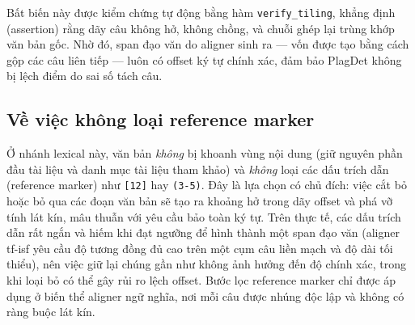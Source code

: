 Bất biến này được kiểm chứng tự động bằng hàm \texttt{verify\_tiling}, khẳng định (assertion) rằng
dãy câu không hở, không chồng, và chuỗi ghép lại trùng khớp văn bản gốc. Nhờ đó, span đạo văn do
aligner sinh ra --- vốn được tạo bằng cách gộp các câu liên tiếp --- luôn có offset ký tự chính
xác, đảm bảo PlagDet không bị lệch điểm do sai số tách câu.

\subsection{Về việc không loại reference marker}

Ở nhánh lexical này, văn bản \emph{không} bị khoanh vùng nội dung (giữ nguyên phần đầu tài liệu và
danh mục tài liệu tham khảo) và \emph{không} loại các dấu trích dẫn (reference marker) như
\texttt{[12]} hay \texttt{(3-5)}. Đây là lựa chọn có chủ đích: việc cắt bỏ hoặc bỏ qua các đoạn văn
bản sẽ tạo ra khoảng hở trong dãy offset và phá vỡ tính lát kín, mâu thuẫn với yêu cầu bảo toàn ký
tự. Trên thực tế, các dấu trích dẫn rất ngắn và hiếm khi đạt ngưỡng để hình thành một span đạo văn
(aligner tf-isf yêu cầu độ tương đồng đủ cao trên một cụm câu liền mạch và độ dài tối thiểu), nên
việc giữ lại chúng gần như không ảnh hưởng đến độ chính xác, trong khi loại bỏ có thể gây rủi ro
lệch offset. Bước lọc reference marker chỉ được áp dụng ở biến thể aligner ngữ nghĩa, nơi mỗi câu
được nhúng độc lập và không có ràng buộc lát kín.
